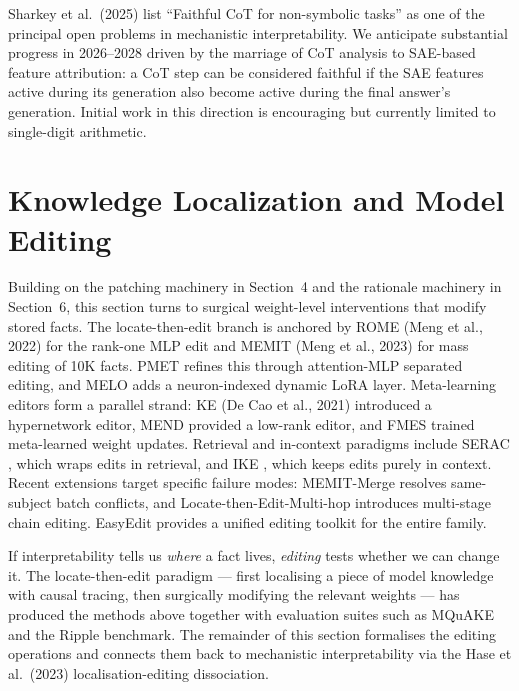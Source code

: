 \documentclass{article}
\begin{document}
Sharkey et al.~(2025) list ``Faithful CoT for non-symbolic tasks'' as one of the principal open problems in mechanistic interpretability. We anticipate substantial progress in 2026--2028 driven by the marriage of CoT analysis to SAE-based feature attribution: a CoT step can be considered faithful if the SAE features active during its generation also become active during the final answer's generation. Initial work in this direction \citep{yeo2024howinterpretablear} is encouraging but currently limited to single-digit arithmetic.

\section{Knowledge Localization and Model Editing}\label{knowledge-localization-and-model-editing}

Building on the patching machinery in Section~4 and the rationale machinery in Section~6, this section turns to surgical weight-level interventions that modify stored facts. The locate-then-edit branch is anchored by ROME (Meng et al., 2022) for the rank-one MLP edit and MEMIT (Meng et al., 2023) for mass editing of 10K facts. PMET \citep{li2024pmetprecisemodeled} refines this through attention-MLP separated editing, and MELO \citep{yu2024interpretingarithm} adds a neuron-indexed dynamic LoRA layer. Meta-learning editors form a parallel strand: KE (De Cao et al., 2021) introduced a hypernetwork editor, MEND \citep{mitchell2022fastmodeleditingat} provided a low-rank editor, and FMES \citep{mitchell2022fastmodeleditingat} trained meta-learned weight updates. Retrieval and in-context paradigms include SERAC \citep{mitchell2022fastmodeleditingat}, which wraps edits in retrieval, and IKE \citep{zheng2024attentionheadsofla}, which keeps edits purely in context. Recent extensions target specific failure modes: MEMIT-Merge \citep{dong2025memitmergeaddressi} resolves same-subject batch conflicts, and Locate-then-Edit-Multi-hop \citep{zhang2024acomprehensivestud} introduces multi-stage chain editing. EasyEdit \citep{wang2023scottselfconsisten} provides a unified editing toolkit for the entire family.

If interpretability tells us \emph{where} a fact lives, \emph{editing} tests whether we can change it. The locate-then-edit paradigm --- first localising a piece of model knowledge with causal tracing, then surgically modifying the relevant weights --- has produced the methods above together with evaluation suites such as MQuAKE and the Ripple benchmark. The remainder of this section formalises the editing operations and connects them back to mechanistic interpretability via the Hase et al.~(2023) localisation-editing dissociation.
\end{document}
